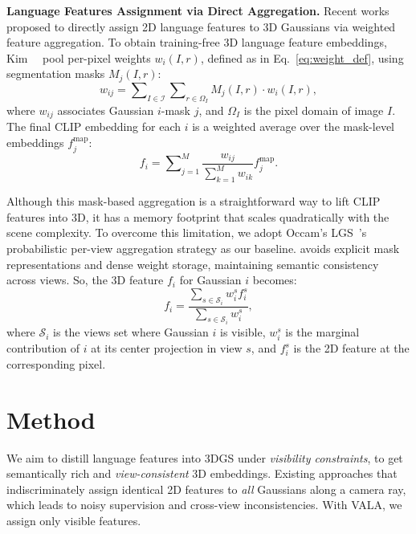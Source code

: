 \textbf{Language Features Assignment via Direct Aggregation.}
Recent works~\cite{drsplat25, cheng2024occam} proposed to directly assign 2D language features to 3D Gaussians via weighted feature aggregation. To obtain training-free 3D language feature embeddings, Kim~\etal~\cite{drsplat25} pool per-pixel weights $w_i(I, r)$, defined as in Eq.~\eqref{eq:weight_def}, using segmentation masks $M_j(I, r)$:
\begin{equation}
w_{ij} = \sum\nolimits_{I \in \mathcal{I}} \sum\nolimits_{r \in \Omega_I} M_j(I, r) \cdot w_i(I, r),
\end{equation}
where $w_{ij}$ associates Gaussian $i$-mask $j$, and $\Omega_I$ is the pixel domain of image $I$. The final CLIP embedding for each $i$ is a weighted average over the mask-level embeddings $f_j^{\mathrm{map}}$:
\begin{equation}
f_i = \sum\nolimits_{j=1}^{M} \frac{w_{ij}}{\sum_{k=1}^{M} w_{ik}} f_j^{\mathrm{map}}.
\label{eq:feature_aggregation_mask}
\end{equation}

Although this mask-based aggregation is a straightforward way to lift CLIP features into 3D, it has a memory footprint that scales quadratically with the scene complexity. To overcome this limitation, we adopt Occam's LGS~\cite{cheng2024occam}'s probabilistic per-view aggregation strategy as our baseline. \cite{cheng2024occam} avoids explicit mask representations and dense weight storage, maintaining semantic consistency across views. So, the 3D feature $f_i$ for Gaussian $i$ becomes:
\begin{equation}
    f_i = \frac{\sum_{s \in \mathcal{S}_i} w^s_i f^s_i}{\sum_{s \in \mathcal{S}_i} w^s_i},
    \label{feature aggregation_view}
\end{equation}
where $\mathcal{S}_i$ is the views set where Gaussian $i$ is visible, $w^s_i$ is the marginal contribution of $i$ at its center projection in view $s$, and $f^s_i$ is the 2D feature at the corresponding pixel.

\section{Method}
We aim to distill language features into 3DGS under \emph{visibility constraints}, to get semantically rich and \emph{view-consistent} 3D embeddings. 
Existing approaches that indiscriminately assign identical 2D features to \textit{all} Gaussians along a camera ray, which leads to noisy supervision and cross-view inconsistencies. With VALA, we assign only visible features.

